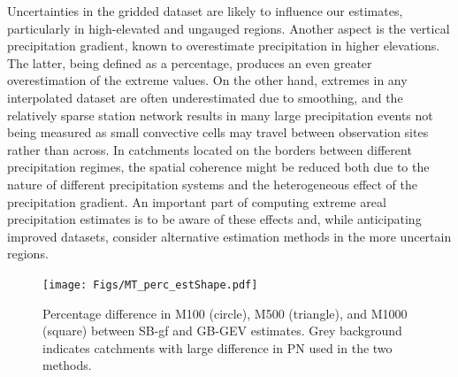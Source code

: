 \documentclass[12pt,a4paper,english]{article}
\begin{document}
Uncertainties in the gridded dataset are likely to influence our estimates, particularly in high-elevated and ungauged regions. Another aspect is the vertical precipitation gradient, known to overestimate precipitation in higher elevations. The latter, being defined as a percentage, produces an even greater overestimation of the extreme values. On the other hand, extremes in any interpolated dataset are often underestimated due to smoothing, and the relatively sparse station network results in many large precipitation events not being measured as small convective cells may travel between observation sites rather than across. In catchments located on the borders between different precipitation regimes, the spatial coherence might be reduced both due to the nature of different precipitation systems and the heterogeneous effect of the precipitation gradient. An important part of computing extreme areal precipitation estimates is to be aware of these effects and, while anticipating improved datasets, consider alternative estimation methods in the more uncertain regions. 

\begin{figure}[!htbp]
\centering
\texttt{[image: Figs/MT\_perc\_estShape.pdf]}
\vspace{-5mm}
\caption[]{\label{data:fig9}Percentage difference in M100 (circle), M500 (triangle), and M1000 (square) between SB-gf and GB-GEV estimates. Grey background indicates catchments with large difference in PN used in the two methods.}
\end{figure}
\end{document}
